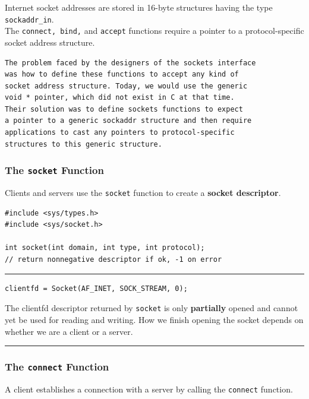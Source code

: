 \documentclass[11pt]{article}
\begin{document}
Internet socket addresses are stored in 16-byte structures having the type \texttt{sockaddr\_in}.\\
The \texttt{connect, bind,} and \texttt{accept} functions require a pointer to a protocol-specific socket address structure.\\


\begin{verbatim}
The problem faced by the designers of the sockets interface 
was how to define these functions to accept any kind of 
socket address structure. Today, we would use the generic 
void * pointer, which did not exist in C at that time. 
Their solution was to define sockets functions to expect 
a pointer to a generic sockaddr structure and then require 
applications to cast any pointers to protocol-specific 
structures to this generic structure. 
\end{verbatim}


\subsubsection{The \texttt{socket} Function}
\label{sec:orgd8f7c93}
Clients and servers use the \texttt{socket} function to create a \textbf{socket descriptor}.\\
\begin{verbatim}
#include <sys/types.h>
#include <sys/socket.h>

int socket(int domain, int type, int protocol);
// return nonnegative descriptor if ok, -1 on error
\end{verbatim}

\noindent\rule{\textwidth}{0.5pt}
\begin{verbatim}
clientfd = Socket(AF_INET, SOCK_STREAM, 0);
\end{verbatim}

The clientfd descriptor returned by \texttt{socket} is only \textbf{partially} opened and cannot yet be used for reading and writing. How we finish opening the socket depends on whether we are a client or a server.\\

\noindent\rule{\textwidth}{0.5pt}

\subsubsection{The \texttt{connect} Function}
\label{sec:orgf9f7c01}
A client establishes a connection with a server by calling the \texttt{connect} function.\\
\end{document}
